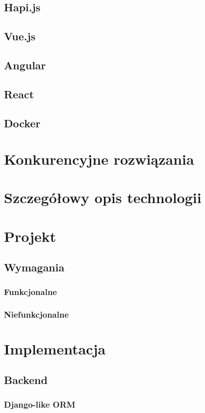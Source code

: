 \documentclass[inzynierska]{pwr_wmat_praca_dyplomowa}
\theoremstyle{plain}
\numberwithin{theorem}{chapter}
\theoremstyle{definition}
\numberwithin{theorem}{chapter}
\begin{document}
    \section{Hapi.js}
    \section{Vue.js}
    \section{Angular}
    \section{React}
    \section{Docker}

    \chapter{Konkurencyjne rozwiązania}

    \chapter{Szczegółowy opis technologii}
    \chapter{Projekt}
    \section{Wymagania}
    \subsection{Funkcjonalne}
    \subsection{Niefunkcjonalne}
    \chapter{Implementacja}
    \section{Backend}
    \subsection{Django-like ORM}
\end{document}
